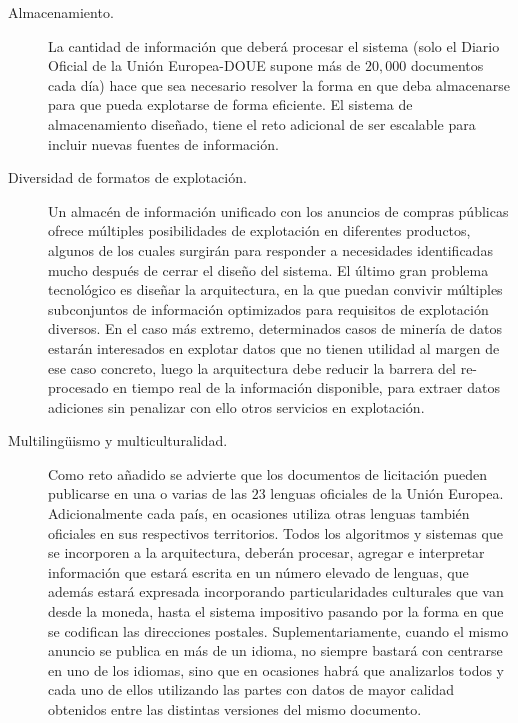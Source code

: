 \begin{description}
\item [Almacenamiento.] La cantidad de información que deberá procesar el sistema (solo el Diario
Oficial de la Unión Europea-\gls{DOUE} supone más de $20,000$ documentos cada día) hace que sea necesario resolver la forma en que
deba almacenarse para que pueda explotarse de forma eficiente. El sistema de
almacenamiento diseñado, tiene el reto adicional de ser escalable para incluir nuevas
fuentes de información.

\item [Diversidad de formatos de explotación.] Un almacén de información unificado con los
anuncios de compras públicas ofrece múltiples posibilidades de explotación en diferentes
productos, algunos de los cuales surgirán para responder a necesidades identificadas mucho
después de cerrar el diseño del sistema. El último gran problema tecnológico es diseñar la
arquitectura, en la que puedan convivir múltiples subconjuntos de información optimizados
para requisitos de explotación diversos. En el caso más extremo, determinados casos de
minería de datos estarán interesados en explotar datos que no tienen utilidad al margen de ese
caso concreto, luego la arquitectura debe reducir la barrera del re-procesado en tiempo real de
la información disponible, para extraer datos adiciones sin penalizar con ello otros servicios en
explotación.

\item [Multiling\"{u}ismo y multiculturalidad.] Como reto añadido se advierte que los documentos de
licitación pueden publicarse en una o varias de las $23$ lenguas oficiales de la Unión Europea.
Adicionalmente cada país, en ocasiones utiliza otras lenguas también oficiales en sus respectivos territorios. Todos
los algoritmos y sistemas que se incorporen a la arquitectura, deberán procesar, agregar e
interpretar información que estará escrita en un número elevado de lenguas, que además
estará expresada incorporando particularidades culturales que van desde la moneda, hasta el
sistema impositivo pasando por la forma en que se codifican las direcciones postales.
Suplementariamente, cuando el mismo anuncio se publica en más de un idioma, no siempre bastará
con centrarse en uno de los idiomas, sino que en ocasiones habrá que analizarlos todos y cada uno de ellos
utilizando las partes con datos de mayor calidad obtenidos entre las distintas versiones del mismo
documento.
\end{description}

